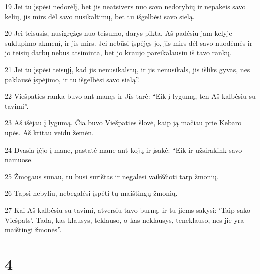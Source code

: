 \par 19 Jei tu įspėsi nedorėlį, bet jis neatsivers nuo savo nedorybių ir nepakeis savo kelių, jis mirs dėl savo nusikaltimų, bet tu išgelbėsi savo sielą. 
\par 20 Jei teisusis, nusigręžęs nuo teisumo, darys pikta, Aš padėsiu jam kelyje suklupimo akmenį, ir jis mirs. Jei nebūsi įspėjęs jo, jis mirs dėl savo nuodėmės ir jo teisių darbų nebus atsiminta, bet jo kraujo pareikalausiu iš tavo rankų. 
\par 21 Jei tu įspėsi teisųjį, kad jis nenusikalstų, ir jis nenusikals, jis išliks gyvas, nes paklausė įspėjimo, ir tu išgelbėsi savo sielą”. 
\par 22 Viešpaties ranka buvo ant manęs ir Jis tarė: “Eik į lygumą, ten Aš kalbėsiu su tavimi”. 
\par 23 Aš išėjau į lygumą. Čia buvo Viešpaties šlovė, kaip ją mačiau prie Kebaro upės. Aš kritau veidu žemėn. 
\par 24 Dvasia įėjo į mane, pastatė mane ant kojų ir įsakė: “Eik ir užsirakink savo namuose. 
\par 25 Žmogaus sūnau, tu būsi surištas ir negalėsi vaikščioti tarp žmonių. 
\par 26 Tapsi nebyliu, nebegalėsi įspėti tų maištingų žmonių. 
\par 27 Kai Aš kalbėsiu su tavimi, atversiu tavo burną, ir tu jiems sakysi: ‘Taip sako Viešpats’. Tada, kas klausys, teklauso, o kas neklausys, teneklauso, nes jie yra maištingi žmonės”.



\chapter{4}


